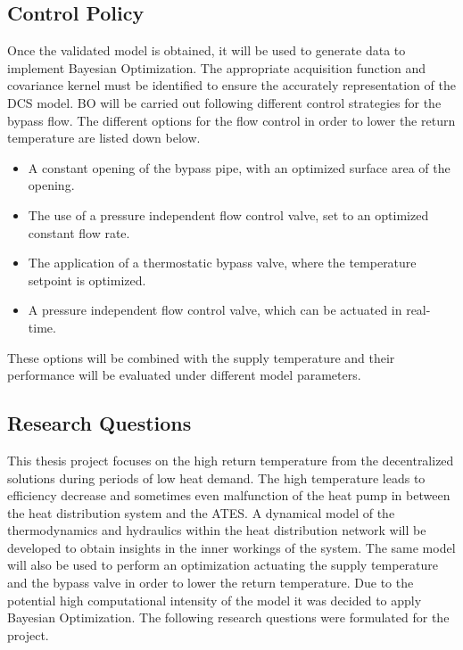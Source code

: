\subsection{Control Policy}
Once the validated model is obtained, it will be used to generate data to implement Bayesian Optimization. The appropriate acquisition function and covariance kernel must be identified to ensure the accurately representation of the DCS model. BO will be carried out following different control strategies for the bypass flow. The different options for the flow control in order to lower the return temperature are listed down below.

\begin{itemize} 
    \item A constant opening of the bypass pipe, with an optimized surface area of the opening. 
    \item The use of a pressure independent flow control valve, set to an optimized constant flow rate. 
    \item The application of a thermostatic bypass valve, where the temperature setpoint is optimized. 
    \item A pressure independent flow control valve, which can be actuated in real-time. 
\end{itemize}

These options will be combined with the supply temperature and their performance will be evaluated under different model parameters. 


\subsection{Research Questions}
This thesis project focuses on the high return temperature from the decentralized solutions during periods of low heat demand. The high temperature leads to efficiency decrease and sometimes even malfunction of the heat pump in between the heat distribution system and the ATES. A dynamical model of the thermodynamics and hydraulics within the heat distribution network will be developed to obtain insights in the inner workings of the system. The same model will also be used to perform an optimization actuating the supply temperature and the bypass valve in order to lower the return temperature. Due to the potential high computational intensity of the model it was decided to apply Bayesian Optimization. The following research questions were formulated for the project.  

